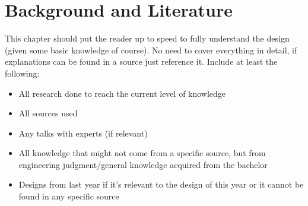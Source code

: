 \chapter{Background and Literature} \label{chapter:bg-and-literature}
This chapter should put the reader up to speed to fully understand the design (given some basic knowledge of course). No need to cover everything in detail, if explanations can be found in a source just reference it. Include at least the following:
\begin{itemize}
    \item All research done to reach the current level of knowledge
    \item All sources used 
    \item Any talks with experts (if relevant)
    \item All knowledge that might not come from a specific source, but from engineering judgment/general knowledge acquired from the bachelor
    \item Designs from last year if it's relevant to the design of this year or it cannot be found in any specific source
\end{itemize}